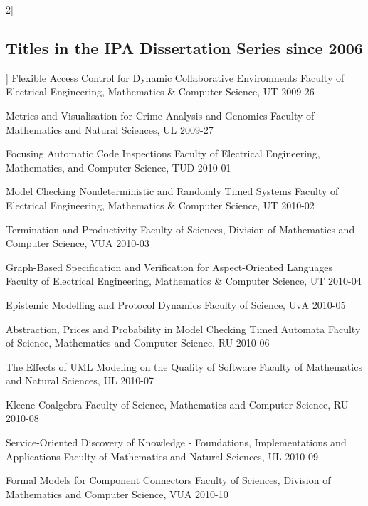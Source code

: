 \begin{multicols}{2}[\subsection*{Titles in the IPA Dissertation Series since 2006}]
         {Flexible Access Control for Dynamic Collaborative Environments}
         {Faculty of Electrical Engineering, Mathematics \& Computer Science, UT}
         {2009-26}

         {Metrics and Visualisation for Crime Analysis and Genomics}
         {Faculty of Mathematics and Natural Sciences, UL}
         {2009-27}

         {Focusing Automatic Code Inspections}
         {Faculty of Electrical Engineering, Mathematics, and Computer Science, TUD}
         {2010-01}

         {Model Checking Nondeterministic and Randomly Timed Systems}
         {Faculty of Electrical Engineering, Mathematics \& Computer Science, UT}
         {2010-02}

         {Termination and Productivity}
         {Faculty of Sciences, Division of Mathematics and Computer Science, VUA}
         {2010-03}

         {Graph-Based Specification and Verification for Aspect-Oriented Languages}
         {Faculty of Electrical Engineering, Mathematics \& Computer Science, UT}
         {2010-04}

         {Epistemic Modelling and Protocol Dynamics}
         {Faculty of Science, UvA}
         {2010-05}

         {Abstraction, Prices and Probability in Model Checking Timed Automata}
         {Faculty of Science, Mathematics and Computer Science, RU}
         {2010-06}

         {The Effects of UML Modeling on the Quality of Software}
         {Faculty of Mathematics and Natural Sciences, UL}
         {2010-07}

         {Kleene Coalgebra}
         {Faculty of Science, Mathematics and Computer Science, RU}
         {2010-08}

         {Service-Oriented Discovery of Knowledge - Foundations, Implementations and Applications}
         {Faculty of Mathematics and Natural Sciences, UL}
         {2010-09}

         {Formal Models for Component Connectors}
         {Faculty of Sciences, Division of Mathematics and Computer Science, VUA}
         {2010-10}


\end{multicols}
